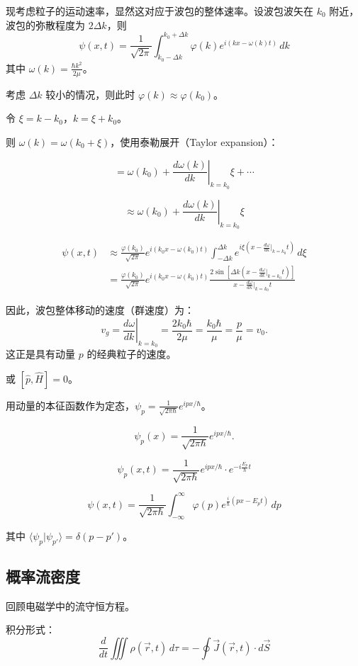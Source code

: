 \documentclass[lang=cn,10pt]{elegantbook}
\begin{document}
现考虑粒子的运动速率，显然这对应于波包的整体速率。设波包波矢在 $k_0$ 附近，波包的弥散程度为 $2\Delta k$，则
\[
\psi(x,t) = \frac{1}{\sqrt{2\pi}} \int_{k_0 - \Delta k}^{k_0 + \Delta k} \varphi(k) e^{i(kx - \omega(k)t)} \, dk
\]
其中 $\omega(k) = \frac{\hbar k^2}{2\mu}$。

考虑 $\Delta k$ 较小的情况，则此时 $\varphi(k) \approx \varphi(k_0)$。

令 $\xi = k - k_0$，$k = \xi + k_0$。

	则 $\omega(k) = \omega(k_0 + \xi)$，使用泰勒展开（Taylor expansion）：

\[
= \omega(k_0) + \left. \frac{d\omega(k)}{dk} \right|_{k=k_0} \xi + \cdots
\]

\[
\approx \omega(k_0) + \left. \frac{d\omega(k)}{dk} \right|_{k=k_0} \xi
\]

	\begin{align*}
		\psi(x,t) &\approx \frac{\varphi(k_0)}{\sqrt{2\pi}} e^{i(k_0x-\omega(k_0)t)}
		\int_{-\Delta k}^{\Delta k} e^{i\xi\left(x-\frac{d\omega}{dk}\big|_{k=k_0}t\right)}\,d\xi \\
		&= \frac{\varphi(k_0)}{\sqrt{2\pi}} e^{i(k_0x-\omega(k_0)t)}
		\frac{2\sin\left[\Delta k\left(x-\frac{d\omega}{dk}\big|_{k=k_0}t\right)\right]}
		{x-\frac{d\omega}{dk}\big|_{k=k_0}t}
	\end{align*}

因此，波包整体移动的速度（群速度）为：
\[
v_g = \left. \frac{d\omega}{dk} \right|_{k=k_0} = \frac{2k_0 \hbar}{2\mu} = \frac{k_0 \hbar}{\mu} = \frac{p}{\mu} = v_0.
\]
这正是具有动量 \(p\) 的经典粒子的速度。

或 \([\hat{p}, \hat{H}] = 0\)。

用动量的本征函数作为定态，\(\psi_p = \frac{1}{\sqrt{2\pi\hbar}} e^{i p x/\hbar}\)。

\[
\psi_p(x) = \frac{1}{\sqrt{2\pi\hbar}} e^{i p x/\hbar}.
\]

\[
\psi_p(x,t) = \frac{1}{\sqrt{2\pi\hbar}} e^{i p x/\hbar} \cdot e^{-i \frac{E_p}{\hbar} t}
\]

\[
\psi(x,t) = \frac{1}{\sqrt{2\pi\hbar}} \int_{-\infty}^{\infty} \varphi(p) e^{\frac{i}{\hbar}(p x - E_p t)} \, dp
\]

其中 \(\langle \psi_p | \psi_{p'} \rangle = \delta(p - p')\)。
\subsection{概率流密度}
回顾电磁学中的流守恒方程。

积分形式：
\[
\frac{d}{dt} \iiint \rho(\vec{r},t) \, d\tau = - \oint \vec{J}(\vec{r},t) \cdot d\vec{S}
\]
\end{document}
